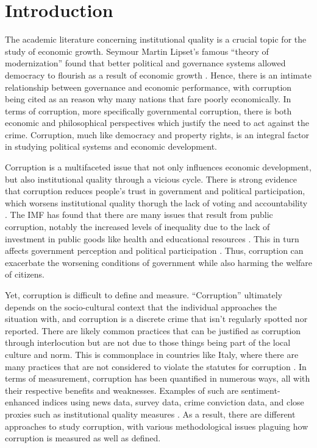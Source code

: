 \documentclass[12pt]{article} %
\begin{document}

\newpage

\section*{Introduction}

The academic literature concerning institutional quality is a crucial topic for the study of economic growth. Seymour Martin Lipset’s famous “theory of modernization” found that better political and governance systems allowed democracy to flourish as a result of economic growth \citep{lipset_social_1959}. Hence, there is an intimate relationship between governance and economic performance, with corruption being cited as an reason why many nations that fare poorly economically. In terms of corruption, more specifically governmental corruption, there is both economic and philosophical perspectives which justify the need to act against the crime. Corruption, much like democracy and property rights, is an integral factor in studying political systems and economic development. 

Corruption is a multifaceted issue that not only influences economic development, but also institutional quality through a vicious cycle. There is strong evidence that corruption reduces people’s trust in government and political participation, which worsens institutional quality thorugh the lack of voting and accountability \citep{giommoni_exposure_2021}. The IMF has found that there are many issues that result from public corruption, notably the increased levels of inequality due to the lack of investment in public goods like health and educational resources \citep{international_monetary_fund_corruption_2016}. This in turn affects government perception and political participation  \citep{lombardo_individual_2022, transparency_international_are_2021}. Thus, corruption can exacerbate the worsening conditions of government while also harming the welfare of citizens. 

Yet, corruption is difficult to define and measure. “Corruption” ultimately depends on the socio-cultural context that the individual approaches the situation with, and corruption is a discrete crime that isn’t regularly spotted nor reported. There are likely common practices that can be justified as corruption through interlocution but are not due to those things being part of the local culture and norm. This is commonplace in countries like Italy, where there are many practices that are not considered to violate the statutes for corruption \citep{pardo_corrupt_2018}. In terms of measurement, corruption has been quantified in numerous ways, all with their respective benefits and weaknesses. Examples of such are sentiment-enhanced indices using news data, survey data, crime conviction data, and close proxies such as institutional quality measures \citep{cao_sentiment-enhanced_2021, del_monte_determinants_2007, grundler_corruption_2019-1}. As a result, there are different approaches to study corruption, with various methodological issues plaguing how corruption is measured as well as defined. 
\end{document}
